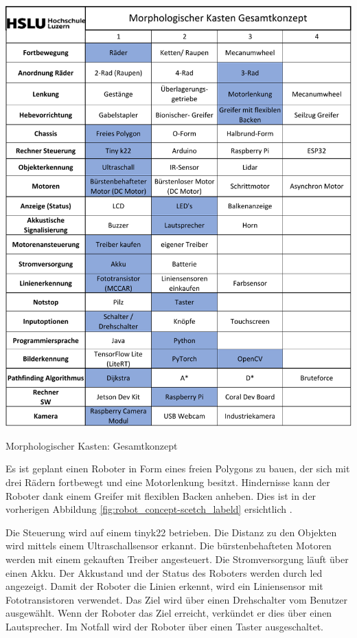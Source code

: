 \begin{table}[H]
\centering
\includegraphics[width=\textwidth -20mm]{assets/MK-all.pdf}
\caption{Morphologischer Kasten: Gesamtkonzept}
\label{table:mk-all}
\end{table}

Es ist geplant einen Roboter in Form eines freien Polygons zu bauen, der sich mit drei Rädern fortbewegt und eine Motorlenkung besitzt. Hindernisse kann der Roboter dank einem Greifer mit flexiblen Backen anheben. Dies ist in der vorherigen Abbildung \ref{fig:robot_concept-scetch_labeld} ersichtlich .

Die Steuerung wird auf einem \gls{tinyk22} betrieben. Die Distanz zu den Objekten wird mittels einem Ultraschallsensor erkannt. Die bürstenbehafteten Motoren werden mit einem gekauften Treiber angesteuert. Die Stromversorgung läuft über einen Akku. Der Akkustand und der Status des Roboters werden durch \acrfull{led} angezeigt. Damit der Roboter die Linien erkennt, wird ein Liniensensor mit Fototransistoren verwendet. Das Ziel wird über einen Drehschalter vom Benutzer ausgewählt.
Wenn der Roboter das Ziel erreicht, verkündet er dies über einen Lautsprecher. Im Notfall wird der Roboter über einen Taster ausgeschaltet.

